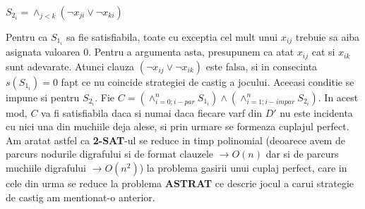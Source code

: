 \documentclass{article}
\begin{document}
\begin{center}
$S_{2_i}=\wedge_{j<k}(\lnot x_{ji}\lor \lnot x_{ki})$
\end{center}
Pentru ca $S_{1_i}$ sa fie satisfiabila, toate cu exceptia cel mult unui $x_{ij}$ trebuie sa aiba asignata valoarea 0. Pentru a argumenta asta, presupunem ca atat $x_{ij}$ cat si $x_{ik}$ sunt adevarate. Atunci clauza $(\lnot x_{ij}\lor \lnot x_{ik})$ este falsa, si in consecinta $s(S_{1_i})=0$ fapt ce nu coincide strategiei de castig a jocului. Aceeasi conditie se impune si pentru $S_{2_i}$. 
\newline
\newline
Fie $C=(\wedge^n_{i=0;i-par}S_{1_i})\land (\wedge^n_{i=1;i-impar}S_{2_i})$. In acest mod, $C$ va fi satisfiabila daca si numai daca fiecare varf din $D'$ nu este incidenta cu nici una din muchiile deja alese, si prin urmare se formeaza cuplajul perfect. 
\newline
\newline
Am aratat astfel ca \textbf{2-SAT}-ul se reduce in timp polinomial (deoarece avem de parcurs nodurile digrafului si de format clauzele $\rightarrow O(n)$ dar si de parcurs muchiile digrafului $\rightarrow O(n^2)$) la problema gasirii unui cuplaj perfect, care in cele din urma se reduce la problema \textbf{ASTRAT} ce descrie jocul a carui strategie de castig am mentionat-o anterior.
\end{document}
